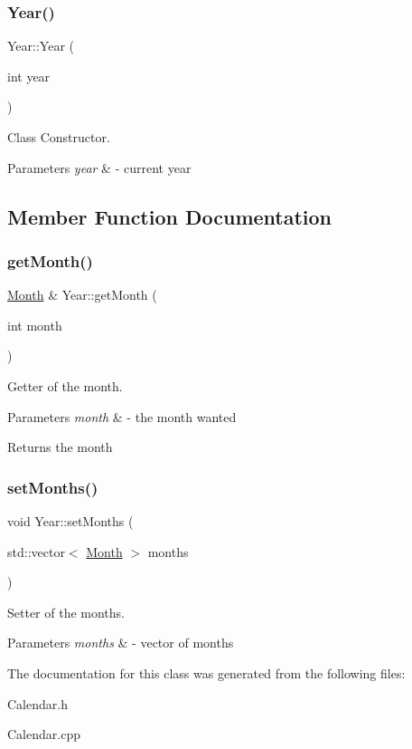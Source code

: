 \subsubsection{\texorpdfstring{Year()}{Year()}}
{\footnotesize\ttfamily Year\+::\+Year (\begin{DoxyParamCaption}\item[{int}]{year }\end{DoxyParamCaption})}



Class Constructor. 


\begin{DoxyParams}{Parameters}
{\em year} & -\/ current year \\
\hline
\end{DoxyParams}


\subsection{Member Function Documentation}
\mbox{\label{class_year_a64bc478fe629fc966b7bfadb1d939a88}} 
\subsubsection{\texorpdfstring{get\+Month()}{getMonth()}}
{\footnotesize\ttfamily \mbox{\hyperlink{class_month}{Month}} \& Year\+::get\+Month (\begin{DoxyParamCaption}\item[{int}]{month }\end{DoxyParamCaption})}



Getter of the month. 


\begin{DoxyParams}{Parameters}
{\em month} & -\/ the month wanted \\
\hline
\end{DoxyParams}
\begin{DoxyReturn}{Returns}
the month 
\end{DoxyReturn}
\mbox{\label{class_year_a1478407d9100f722e54daaf1ce2a413c}} 
\subsubsection{\texorpdfstring{set\+Months()}{setMonths()}}
{\footnotesize\ttfamily void Year\+::set\+Months (\begin{DoxyParamCaption}\item[{std\+::vector$<$ \mbox{\hyperlink{class_month}{Month}} $>$}]{months }\end{DoxyParamCaption})}



Setter of the months. 


\begin{DoxyParams}{Parameters}
{\em months} & -\/ vector of months \\
\hline
\end{DoxyParams}


The documentation for this class was generated from the following files\+:\begin{DoxyCompactItemize}
\item 
Calendar.\+h\item 
Calendar.\+cpp\end{DoxyCompactItemize}
